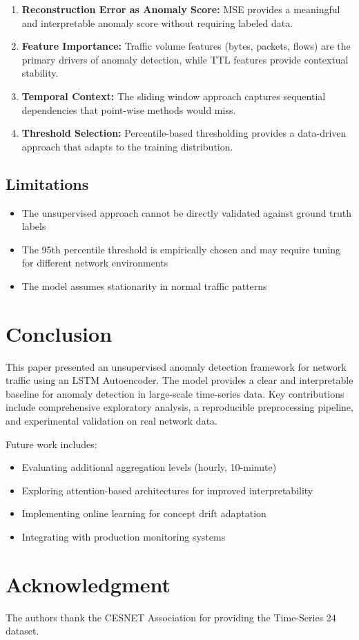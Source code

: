 \documentclass[conference]{IEEEtran}
\begin{document}
\begin{enumerate}
    \item \textbf{Reconstruction Error as Anomaly Score:} MSE provides a meaningful and interpretable anomaly score without requiring labeled data.
    
    \item \textbf{Feature Importance:} Traffic volume features (bytes, packets, flows) are the primary drivers of anomaly detection, while TTL features provide contextual stability.
    
    \item \textbf{Temporal Context:} The sliding window approach captures sequential dependencies that point-wise methods would miss.
    
    \item \textbf{Threshold Selection:} Percentile-based thresholding provides a data-driven approach that adapts to the training distribution.
\end{enumerate}

\subsection{Limitations}
\begin{itemize}
    \item The unsupervised approach cannot be directly validated against ground truth labels
    \item The 95th percentile threshold is empirically chosen and may require tuning for different network environments
    \item The model assumes stationarity in normal traffic patterns
\end{itemize}

\section{Conclusion}
This paper presented an unsupervised anomaly detection framework for network traffic using an LSTM Autoencoder. The model provides a clear and interpretable baseline for anomaly detection in large-scale time-series data. Key contributions include comprehensive exploratory analysis, a reproducible preprocessing pipeline, and experimental validation on real network data.

Future work includes:
\begin{itemize}
    \item Evaluating additional aggregation levels (hourly, 10-minute)
    \item Exploring attention-based architectures for improved interpretability
    \item Implementing online learning for concept drift adaptation
    \item Integrating with production monitoring systems
\end{itemize}

\section*{Acknowledgment}
The authors thank the CESNET Association for providing the Time-Series 24 dataset.



\end{document}
